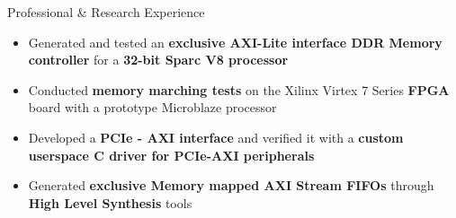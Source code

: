 \documentclass{resume}
\begin{document}
\begin{rSection}{Professional \& Research Experience}
\begin{itemize}[leftmargin=*]
	\item Generated and tested an {\bf exclusive AXI-Lite interface DDR
		Memory controller} for a {\bf 32-bit Sparc V8 processor}
	      
	\item Conducted {\bf memory marching tests} on the Xilinx Virtex 7 Series {\bf FPGA} board with a prototype Microblaze processor
	
	\item Developed a {\bf PCIe - AXI interface} and verified it with a {\bf
		custom userspace C driver for PCIe-AXI peripherals}

	\item Generated {\bf exclusive Memory mapped AXI Stream FIFOs} through {\bf High Level Synthesis} tools

\end{itemize}

\end{rSection}
\end{document}

